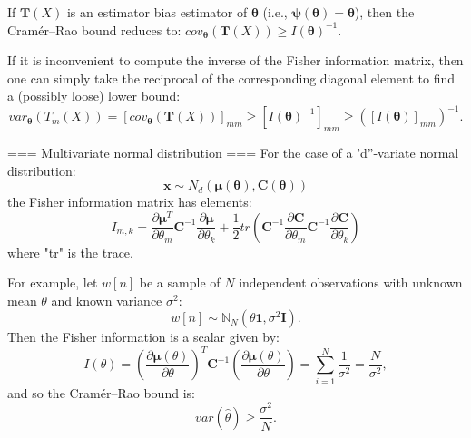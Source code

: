 \documentclass[a4paper]{report}
\begin{document}
If $\mathbf{T}(X)$ is an estimator bias estimator of $\mathbf{\theta}$ (i.e., $\mathbf{\psi}\left(\mathbf{\theta}\right) = \mathbf{\theta}$), then the Cramér–Rao bound reduces to: ${cov}_{\mathbf{\theta}}\left(\mathbf{T}(X)\right)
\geq
I\left(\mathbf{\theta}\right)^{-1}.$

If it is inconvenient to compute the inverse of the Fisher information matrix,
then one can simply take the reciprocal of the corresponding diagonal element
to find a (possibly loose) lower bound:
$$
{var}_{\mathbf{\theta}}(T_m(X)) =
\left[{cov}_{\mathbf{\theta}}\left(\mathbf{T}(X)\right)\right]_{mm}
\geq
\left[I\left(\mathbf{\theta}\right)^{-1}\right]_{mm}
\geq
\left(\left[I\left(\mathbf{\theta}\right)\right]_{mm}\right)^{-1}.
$$

=== Multivariate normal distribution ===
For the case of a 'd''-variate normal distribution:
$$
\mathbf{x}
\sim
N_d
\left(
\mathbf{\mu}( \mathbf{\theta}),
{\mathbf C} ( \mathbf{\theta})
\right)
$$
the Fisher information matrix has elements:
$$
I_{m, k}
= \frac{\partial \mathbf{\mu}^T}{\partial \theta_m}
{\mathbf C}^{-1}
\frac{\partial \mathbf{\mu}}{\partial \theta_k}
+ \frac{1}{2}{tr}
\left(
{\mathbf C}^{-1}
\frac{\partial {\mathbf C}}{\partial \theta_m}
{\mathbf C}^{-1}
\frac{\partial {\mathbf C}}{\partial \theta_k}
\right)
$$
where "tr" is the trace.

For example, let $w[n]$ be a sample of $N$ independent observations with unknown mean $\theta$ and known variance $\sigma^2$:
$$
w[n] \sim \mathbb{N}_N \left(\theta {\mathbf 1}, \sigma^2 {\mathbf I} \right).
$$
Then the Fisher information is a scalar given by:
$$
I(\theta)=
\left(\frac{\partial\mathbf{\mu}(\theta)}{\partial\theta}\right)^T{\mathbf C}^{-1} \left(\frac{\partial\mathbf{\mu}(\theta)}{\partial\theta}\right)
= \sum^N_{i=1}\frac{1}{\sigma^2} = \frac{N}{\sigma^2},
$$
and so the Cramér–Rao bound is:
$$
{var}\left(\hat \theta\right)
\geq
\frac{\sigma^2}{N}.
$$
\end{document}
